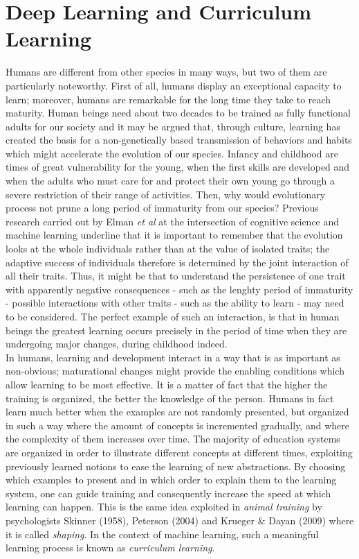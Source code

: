\chapter{Deep Learning and Curriculum Learning}
Humans are different from other species in many ways, but two of them are particularly noteworthy. 
First of all, humans display an exceptional capacity to learn;
moreover, humans are remarkable for the long time they take to reach maturity. Human beings need about two decades to be trained as fully functional adults for our society and it may
be argued that, through culture, learning has created the basis for a non-genetically based transmission of behaviors and habits which might
accelerate the evolution of our species. Infancy and childhood are times of great vulnerability for the young, when the first skills are developed and when the adults who
must care for and protect their own young go through a severe restriction of their range of activities. Then, why would evolutionary process not prune a long period of 
immaturity from our species? Previous research carried out by Elman \textit{et al} \cite{ELMAN199371} at the intersection of cognitive science
and machine learning underline that it is important to remember that the evolution looks at the whole individuals rather than at the value of isolated traits; the adaptive success of individuals therefore is 
determined by the joint interaction of all their traits. Thus, it might be that to understand the persistence of one trait with apparently negative consequences - such as the lenghty period of immaturity - possible interactions
with other traits - such as the ability to learn - may need to be considered. The perfect example of such an interaction, is that in human beings the greatest learning occurs precisely in the period of time
when they are undergoing major changes, during childhood indeed.\\
In humans, learning and development interact in a way that is as important as non-obvious; maturational changes might provide the enabling 
conditions which allow learning to be most effective.
It is a matter of fact that the higher the training is organized, the better the knowledge of the person. Humans in fact learn much better when the examples are not randomly presented, but organized in such a way 
where the amount of concepts is incremented gradually, and where the complexity of them increases over time. The majority of education systems are organized in order to illustrate 
different concepts at different times, exploiting previously learned notions to ease the learning of new abstractions. By choosing which examples to present and in which order to explain them to the learning system, one can guide
training and consequently increase the speed at which learning can happen. This is the same idea exploited in \textit{animal training} by psychologists Skinner (1958), Peterson (2004) and Krueger \& Dayan (2009)
where it is called \textit{shaping}.
In the context of machine learning, such a meaningful learning process is known as \textit{curriculum learning}.

